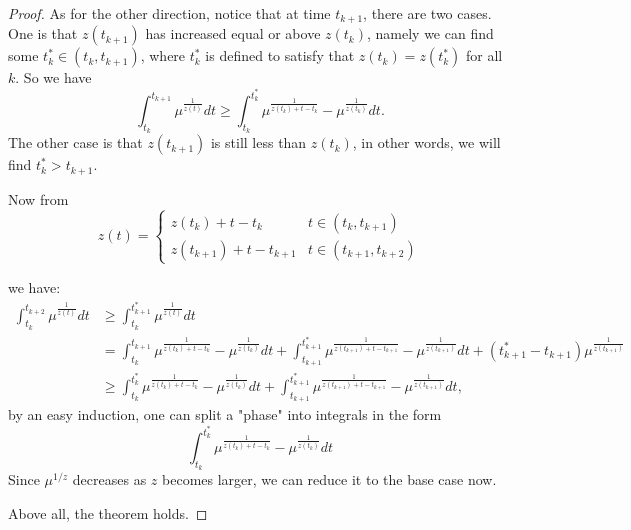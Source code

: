 \documentclass[12pt,abstract=true]{scrartcl}
\numberwithin{equation}{section}
\theoremstyle{definition}   \newtheorem{definition}{Definition}[section]
\theoremstyle{plain}        \newtheorem{theorem}{Theorem}[section]
\theoremstyle{plain}        \newtheorem{observation}{Observation}[section]
\theoremstyle{plain}        \newtheorem{fact}{Fact}[section]
\theoremstyle{plain}        \newtheorem{claim}{Claim}[section]
\theoremstyle{plain}        \newtheorem{lemma}[theorem]{Lemma}
\theoremstyle{plain}        \newtheorem{corollary}[theorem]{Corollary}
\theoremstyle{remark}       \newtheorem{example}{Example}[section]
\theoremstyle{remark}       \newtheorem{remark}{Remark}[section]
\begin{document}
\begin{proof}
As for the other direction, notice that at time $t_{k+1}$, there are two cases. One is that $z(t_{k+1})$ has increased equal or above $z(t_k)$, namely we can find some $t_k^*\in (t_k, t_{k+1})$, where $t_k^*$ is defined to satisfy that $z(t_k)=z(t_k^*)$ for all $k$. So we have
\begin{equation}
\int_{t_k}^{t_{k+1}} \mu^{\frac{1}{z(t)}} dt \ge \int_{t_k}^{t_k^*} \mu^{\frac{1}{z(t_k)+t-t_k}} - \mu^{\frac{1}{z(t_{k})}}dt.
\end{equation}
The other case is that $z(t_{k+1})$ is still less than $z(t_{k})$, in other words, we will find $t_k^*>t_{k+1}$.  

Now from
\begin{equation}
z(t)=
\begin{cases}
z(t_k)+t-t_k&  t\in (t_k, t_{k+1})\\
z(t_{k+1})+t-t_{k+1}& t\in (t_{k+1}, t_{k+2})
\end{cases}
\end{equation}

we have:
\begin{equation}
\begin{split}
\int_{t_k}^{t_{k+2}} \mu^{\frac{1}{z(t)}} dt &\ge \int_{t_k}^{t_{k+1}^*} \mu^{\frac{1}{z(t)}} dt \\
&= \int_{t_k}^{t_{k+1}} \mu^{\frac{1}{z(t_k)+t-t_k}} - \mu^{\frac{1}{z(t_{k})}}  dt + \int_{t_{k+1}}^{t_{k+1}^*} \mu^{\frac{1}{z(t_{k+1})+t-t_{k+1}}} -  \mu^{\frac{1}{z(t_{k+1})}} dt + (t_{k+1}^*-t_{k+1})\mu^{\frac{1}{z(t_{k+1})}}\\
&\ge \int_{t_k}^{t_{k}^*} \mu^{\frac{1}{z(t_k)+t-t_k}} - \mu^{\frac{1}{z(t_{k})}}dt + \int_{t_{k+1}}^{t_{k+1}^*} \mu^{\frac{1}{z(t_{k+1})+t-t_{k+1}}} - \mu^{\frac{1}{z(t_{k+1})}}dt,
\end{split}
\end{equation}
by an easy induction, one can split a "phase" into integrals in the form 
\begin{equation}
\int_{t_k}^{t_{k}^*} \mu^{\frac{1}{z(t_k)+t-t_k}} - \mu^{\frac{1}{z(t_{k})}}dt
\end{equation}
 Since $ \mu^{1/z}$ decreases as $z$ becomes larger, we can reduce it to the base case now.

Above all, the theorem holds.
\end{proof}
\end{document}
